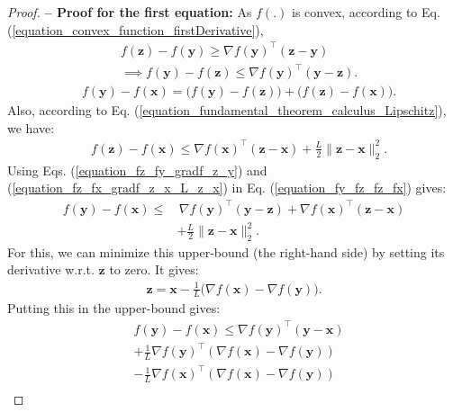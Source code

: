 \documentclass[lang=cn,10pt]{gorgeousnbook}
\numberwithin{equation}{section}%
\numberwithin{figure}{section}%
\begin{document}
\begin{proof}
\textbf{-- Proof for the first equation:}
As $f(.)$ is convex, according to Eq. (\ref{equation_convex_function_firstDerivative}), 
\begin{align}
&f(\boldsymbol{z}) - f(\boldsymbol{y}) \geq \nabla f(\boldsymbol{y})^\top (\boldsymbol{z} - \boldsymbol{y}) \nonumber \\
&\implies f(\boldsymbol{y}) - f(\boldsymbol{z}) \leq \nabla f(\boldsymbol{y})^\top (\boldsymbol{y} - \boldsymbol{z}). \label{equation_fz_fy_gradf_z_y}
\end{align}
\begin{align}\label{equation_fy_fz_fz_fx}
&f(\boldsymbol{y}) - f(\boldsymbol{x}) = \big(f(\boldsymbol{y}) - f(\boldsymbol{z})\big) + \big(f(\boldsymbol{z}) - f(\boldsymbol{x})\big).
\end{align}
Also, according to Eq. (\ref{equation_fundamental_theorem_calculus_Lipschitz}), we have:
\begin{align}\label{equation_fz_fx_gradf_z_x_L_z_x}
&f(\boldsymbol{z}) - f(\boldsymbol{x}) \leq \nabla f(\boldsymbol{x})^\top (\boldsymbol{z} - \boldsymbol{x}) + \frac{L}{2} \|\boldsymbol{z} - \boldsymbol{x}\|_2^2.
\end{align}
Using Eqs. (\ref{equation_fz_fy_gradf_z_y}) and (\ref{equation_fz_fx_gradf_z_x_L_z_x}) in Eq. (\ref{equation_fy_fz_fz_fx}) gives:
\begin{align*}
f(\boldsymbol{y}) - f(\boldsymbol{x}) \leq &\,\nabla f(\boldsymbol{y})^\top (\boldsymbol{y} - \boldsymbol{z}) + \nabla f(\boldsymbol{x})^\top (\boldsymbol{z} - \boldsymbol{x}) \\
&+ \frac{L}{2} \|\boldsymbol{z} - \boldsymbol{x}\|_2^2.
\end{align*}
For this, we can minimize this upper-bound (the right-hand side) by setting its derivative w.r.t. $\boldsymbol{z}$ to zero. It gives:
\begin{align*}
\boldsymbol{z} = \boldsymbol{x} - \frac{1}{L} \big(\nabla f(\boldsymbol{x}) - \nabla f(\boldsymbol{y})\big).
\end{align*}
Putting this in the upper-bound gives:
\begin{align*}
&f(\boldsymbol{y}) - f(\boldsymbol{x}) \leq \nabla f(\boldsymbol{y})^\top (\boldsymbol{y} - \boldsymbol{x}) \\
&+ \frac{1}{L} \nabla f(\boldsymbol{y})^\top (\nabla f(\boldsymbol{x}) - \nabla f(\boldsymbol{y})) \\
&- \frac{1}{L} \nabla f(\boldsymbol{x})^\top (\nabla f(\boldsymbol{x}) - \nabla f(\boldsymbol{y})) \\

\end{align*}
\end{proof}
\end{document}
